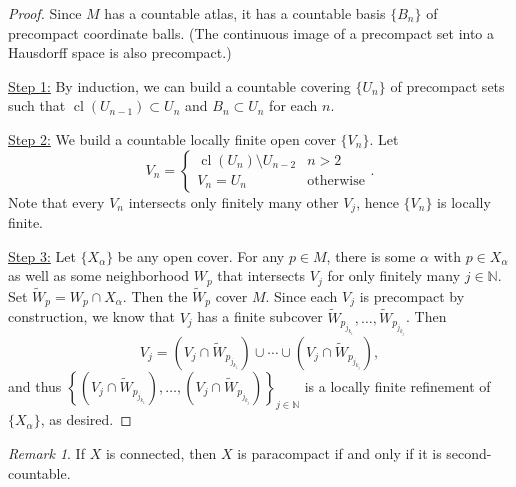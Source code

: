\documentclass[10pt,letterpaper,cm]{nupset}
\theoremstyle{definition}
\theoremstyle{theorem}
\theoremstyle{remark}
\newtheorem{remark}[definition]{Remark}
\newcommand{\N}{\mathbb N}
\newcommand{\1}{\mathbf{1}}
\newcommand{\0}{\vec 0}
\DeclareMathOperator{\cl}{cl}
\begin{document}
\begin{proof}
Since $M$ has a countable atlas, it has a countable basis $\{B_n\}$ of precompact coordinate balls. (The continuous image of a precompact set into a Hausdorff space is also precompact.)

\medskip


\underline{Step 1:} By induction, we can build a countable covering $\{U_n\}$ of precompact sets such that $\cl(U_{n-1}) \subset U_n$ and $B_n \subset U_n$ for each $n$.

\medskip


\underline{Step 2:} We build a countable locally finite open cover $\{V_n\}$. Let 
\[
V_n = \begin{cases}
\cl(U_n) \setminus U_{n-2} & n > 2
\\ V_n = U_n &  \text{otherwise}
\end{cases}.
\] Note that every $V_n$ intersects only finitely many other $V_j$, hence $\{V_n\}$ is locally finite.

\medskip


\underline{Step 3:} Let $\{X_\alpha\}$ be any open cover. For any $p \in M$, there is some $\alpha$ with $p\in X_\alpha$ as well as some neighborhood $W_p$ that intersects $V_j$ for only finitely many  $j\in \N$. Set $\widetilde{W}_p = W_p \cap X_\alpha$. Then the $\widetilde{W}_p$ cover $M$. Since each $V_j$ is precompact by construction, we know that $V_j$ has a finite subcover $\widetilde{W}_{p_{j_{k_1}}}, \ldots, \widetilde{W}_{p_{j_{k_j}}}$. Then $$V_j = \left(V_j \cap \widetilde{W}_{p_{j_{k_1}}}\right) \cup \cdots \cup \left(V_j \cap \widetilde{W}_{p_{j_{k_j}}}\right),$$ and thus $\left\{\left(V_j \cap \widetilde{W}_{p_{j_{k_1}}}\right), \ldots, \left(V_j \cap \widetilde{W}_{p_{j_{k_j}}}\right)\right\}_{j \in \N}$ is a locally finite refinement of $\{X_\alpha\}$, as desired.
\end{proof}

\begin{remark}
If $X$ is connected, then $X$ is paracompact if and only if it is second-countable.  
\end{remark}
\end{document}

